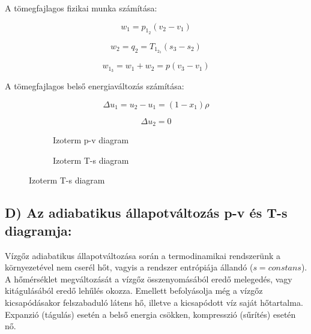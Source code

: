 A tömegfajlagos fizikai munka számítása:

\begin{equation*}
w_1 = p_1_2(v_2-v_1)
\end{equation*}

\begin{equation*}
w_2 = q_2 = T_1_2_3(s_3-s_2) 
\end{equation*}

\begin{equation*}
w_1_3 = w_1+w_2 = p(v_3-v_1)
\end{equation*}

A tömegfajlagos belső energiaváltozás számítása:

\begin{equation*}
\Delta u_1 = u_2-u_1 = (1-x_1)\rho
\end{equation*}

\begin{equation*}
\Delta u_2 =0
\end{equation*}


\begin{figure}[h]
	\centering
	\begin{subfigure}[b]{0.545\textwidth} 
		\centering
		\begin{tikzpicture}
		
		
		
		\end{tikzpicture}
		\caption{Izoterm p-v diagram}
		
	\end{subfigure}
	\begin{subfigure}[b]{0.435\textwidth}
		\centering
		\begin{tikzpicture}
		
		
		
		\end{tikzpicture}
		\caption{Izoterm T-s diagram}
		
	\end{subfigure}
\end{figure}

\pagebreak

\subsection*{D) Az adiabatikus állapotváltozás p-v és T-s diagramja:}

Vízgőz adiabatikus állapotváltozása során a termodinamikai rendszerünk a környezetével nem cserél hőt, vagyis a rendszer entrópiája állandó ($s=constans$). A hőmérséklet megváltozását a vízgőz összenyomásából eredő melegedés, vagy kitágulásából eredő lehűlés okozza. Emellett befolyásolja még a vízgőz kicsapódásakor felszabaduló látens hő, illetve a kicsapódott víz saját hőtartalma. Expanzió (tágulás) esetén a belső energia csökken, kompresszió (sűrítés) esetén nő.

